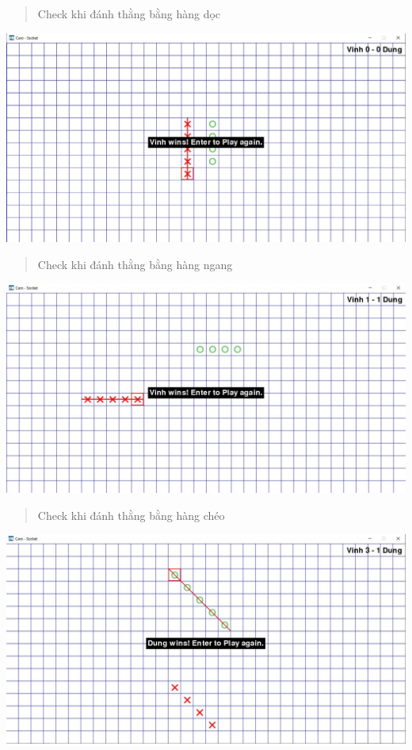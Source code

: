 \documentclass[a4paper]{article}
\begin{document}
\begin{quotation}
    Check khi đánh thằng bằng hàng dọc
\end{quotation} 
\includegraphics[width=14cm]{images/app/check_vertical.png}
\begin{quotation}
    Check khi đánh thằng bằng hàng ngang
\end{quotation} 
\includegraphics[width=14cm]{images/app/check_horizal.png}
\begin{quotation}
    Check khi đánh thằng bằng hàng chéo
\end{quotation}
\includegraphics[width=14cm]{images/app/check_cheo.png}
\end{document}
